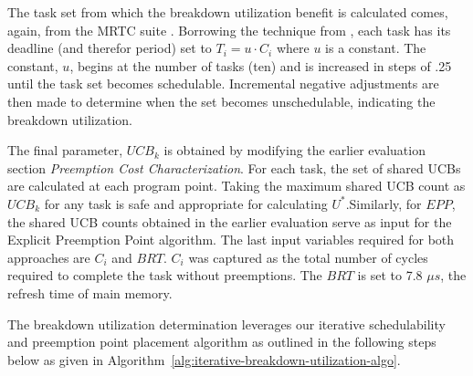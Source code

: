 The task set from which the breakdown utilization benefit is
calculated comes, again, from the MRTC suite \cite{mrtc:01}. Borrowing
the technique from \cite{lunniss:13}, each task has its deadline (and
therefor period) set to ${T_i = u \cdot C_i}$
where ${u}$ is a constant. The constant, ${u}$, begins at the number
of tasks (ten) and is increased in steps of .25 until the task set
becomes schedulable. Incremental negative adjustments are then made to
determine when the set becomes unschedulable, indicating the breakdown
utilization.

The final parameter, ${UCB_k}$ is obtained by modifying the earlier
evaluation section \emph{Preemption Cost Characterization}. For each
task, the set of shared UCBs are calculated at each program
point. Taking the maximum shared UCB count as ${UCB_k}$ for any task
is safe and appropriate for calculating ${U^*}$.Similarly, for ${EPP}$,
the shared UCB counts obtained in the earlier evaluation serve as input for
the Explicit Preemption Point algorithm.  The last input variables required
for both approaches are ${C_i}$ and ${BRT}$. ${C_i}$ was captured as the
total number of cycles required to complete the task without preemptions.
The ${BRT}$ is set to 7.8 ${{\mu}s}$, the refresh time of main memory.

The breakdown utilization determination leverages our iterative schedulability
and preemption point placement algorithm as outlined in the following steps below
as given in Algorithm~\ref{alg:iterative-breakdown-utilization-algo}.

